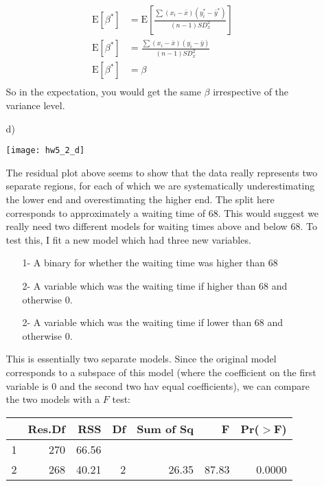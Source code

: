 \documentclass[11pt]{article}
\newcommand{\E}{\mathrm{E}}
\theoremstyle{definition}
\begin{document}
\begin{itemize}
\begin{itemize}
\begin{align*}
                    \E[\beta^*] &= \E\left[\frac{\sum(x_i-\bar x)(y_i^*-\bar y^*)}{(n-1)SD_x^2}\right] \\
                    \E[\beta^*] &= \frac{\sum(x_i-\bar x)(y_i-\bar y)}{(n-1)SD_x^2} \\
                    \E[\beta^*] &= \beta \\
                \end{align*}
                So in the expectation, you would get the same $\beta$ irrespective of the variance level.
            \item[d)]
                \begin{center}
                    \texttt{[image: hw5\_2\_d]}
                \end{center}
                The residual plot above seems to show that the data really represents two separate regions, for each of which we are systematically underestimating the lower end and overestimating the higher end. The split here corresponds to approximately a waiting time of $68$. This would suggest we really need two different models for waiting times above and below $68$. To test this, I fit a new model which had three new variables.
                \begin{itemize}
                    \item[1-] A binary for whether the waiting time was higher than $68$
                    \item[2-] A variable which was the waiting time if higher than $68$ and otherwise $0$.
                    \item[2-] A variable which was the waiting time if lower than $68$ and otherwise $0$.
                \end{itemize}
                This is essentially two separate models. Since the original model corresponds to a subspace of this model (where the coefficient on the first variable is $0$ and the second two hav equal coefficients), we can compare the two models with a $F$ test: \\
                \begin{table}[ht]
                \centering
                \begin{tabular}{lrrrrrr}
                    \hline
                       & Res.Df & RSS & Df & Sum of Sq & F & Pr($>$F) \\ 
                        \hline
                        1 & 270 & 66.56 &  &  &  &  \\ 
                          2 & 268 & 40.21 & 2 & 26.35 & 87.83 & 0.0000 \\ 

\end{tabular}
\end{table}
\end{itemize}
\end{itemize}
\end{document}
